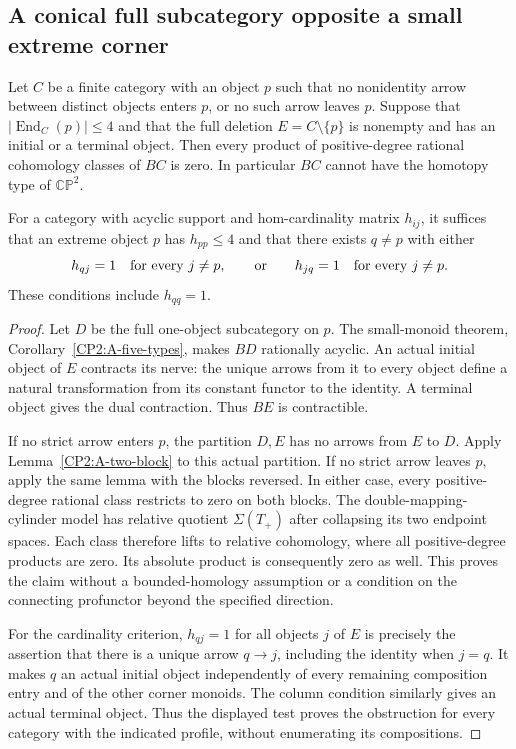 \subsection{A conical full subcategory opposite a small extreme corner}

\begin{proposition}[Proved]\label{CP2:A-conical-block-cut}
Let $C$ be a finite category with an object $p$ such that no
nonidentity arrow between distinct objects enters $p$, or no
such arrow leaves $p$. Suppose that $|\operatorname{End}_C(p)|\leq4$
and that the full deletion $E=C\setminus\{p\}$ is nonempty
and has an initial or a terminal object. Then every product
of positive-degree rational cohomology classes of $BC$ is zero.
In particular $BC$ cannot have the homotopy type of $\mathbb{CP}^2$.

For a category with acyclic support and hom-cardinality matrix
$h_{ij}$, it suffices that an extreme object $p$ has
$h_{pp}\leq4$ and that there exists $q\ne p$ with either
\[
 h_{qj}=1\quad\hbox{for every }j\ne p,
 \qquad\hbox{or}\qquad
 h_{jq}=1\quad\hbox{for every }j\ne p.
\]
These conditions include $h_{qq}=1$.
\end{proposition}
\begin{proof}
Let $D$ be the full one-object subcategory on $p$. The
small-monoid theorem, Corollary~\ref{CP2:A-five-types}, makes
$BD$ rationally acyclic. An actual initial object of $E$
contracts its nerve: the unique arrows from it to every
object define a natural transformation from its constant
functor to the identity. A terminal object gives the dual
contraction. Thus $BE$ is contractible.

If no strict arrow enters $p$, the partition $D,E$ has no
arrows from $E$ to $D$. Apply Lemma~\ref{CP2:A-two-block} to
this actual partition. If no strict arrow leaves $p$, apply
the same lemma with the blocks reversed. In either case,
every positive-degree rational class restricts to zero on
both blocks. The double-mapping-cylinder model has relative
quotient $\Sigma(T_+)$ after collapsing its two endpoint
spaces. Each class therefore lifts to relative cohomology,
where all positive-degree products are zero. Its absolute
product is consequently zero as well. This proves the claim
without a bounded-homology assumption or a condition on the
connecting profunctor beyond the specified direction.

For the cardinality criterion, $h_{qj}=1$ for all objects
$j$ of $E$ is precisely the assertion that there is a unique
arrow $q\to j$, including the identity when $j=q$. It makes
$q$ an actual initial object independently of every remaining
composition entry and of the other corner monoids. The column
condition similarly gives an actual terminal object. Thus
the displayed test proves the obstruction for every category
with the indicated profile, without enumerating its compositions.
\end{proof}

